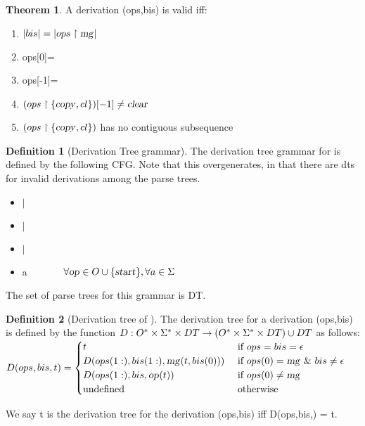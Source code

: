 \documentclass[12pt]{article}
\theoremstyle{definition}
\newtheorem{definition}{Definition}[section]
\newtheorem{thm}{Theorem}[section]
\begin{document}
\begin{thm}
  A derivation (ops,bis) is valid iff:

  \begin{enumerate}
  \item $|bis|=|ops\restriction\text{\textsl{mg}}| $
  \item ops[0]=\mg
  \item ops[-1]=\ed
  \item $(ops\restriction \{\text{\textsl{copy}},cl\})[-1]\neq\text{\textsl{clear}}$
  \item $(ops\restriction \{\text{\textsl{copy}},cl\})$ has no contiguous subsequence \cl \cl
\end{enumerate}

\end{thm}



\begin{definition}[Derivation Tree grammar]
  The derivation tree grammar for \OURG is defined by the following CFG. Note that this overgenerates, in that there are dts for invalid derivations among the parse trees.
  \begin{itemize}
  \item \cp \arr \cp $|$ \mg
  \item \cl \arr \cp $|$ \mg
  \item \ed \arr \cp $|$ \mg
  \item \mg \arr \op a ~~~~~~ $\forall \text{\textsl{op}}\in O\cup\{\text{\textsl{start}}\}, \forall a\in\Sigma$
  \end{itemize}

  The set of parse trees for this grammar is DT.
  
\end{definition}


\begin{definition}[Derivation tree of \OURG]
  The derivation tree for a derivation (ops,bis) is defined by the function $D:O^* \times \Sigma^* \times DT \rightarrow (O^* \times \Sigma^* \times DT) \cup DT$ as follows:\\

  $D(ops,bis,t)=  
  \begin{cases}
    t & \text{ if } ops=bis=\epsilon\\
    D(ops(1:),bis(1:),\text{\textsl{mg}}(t,bis(0))) & \text{ if } ops(0)=\text{\textsl{mg}} ~\&~ bis\neq\epsilon\\
    D(ops(1:),bis,\text{\textsl{op}}(t)) & \text{ if } ops(0)\neq\text{\textsl{mg}}\\
    \text{undefined} & \text{ otherwise}
  \end{cases}
  $
  
  We say t is the derivation tree for the derivation (ops,bis) iff D(ops,bis,\start) = t.
\end{definition}
\end{document}
